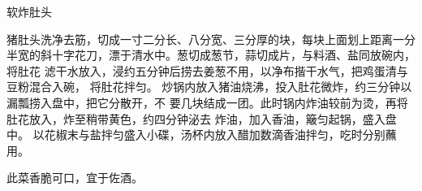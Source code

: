 \begin{recipe}{软炸肚头}

\ingredients


\cooking

\step 猪肚头洗净去筋，切成一寸二分长、八分宽、三分厚的块，每块上面划上距离一分
半宽的斜十字花刀，漂于清水中。葱切成葱节，蒜切成片，与料酒、盐同放碗内，将肚花
滤干水放入，浸约五分钟后捞去姜葱不用，以净布揩干水气，把鸡蛋清与豆粉混合入碗，
将肚花拌匀。
\step 炒锅内放入猪油烧沸，投入肚花微炸，约三分钟以漏瓢捞入盘中，把它分散开，不
要几块结成一团。此时锅内炸油较前为烫，再将肚花放入，炸至稍带黄色，约四分钟泌去
炸油，加入香油，簸匀起锅，盛入盘中。
\step 以花椒末与盐拌匀盛入小碟，汤杯内放入醋加数滴香油拌匀，吃时分别蘸用。

\notes

此菜香脆可口，宜于佐酒。

\end{recipe}

